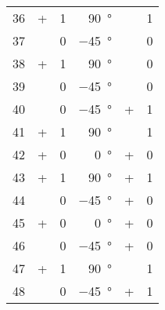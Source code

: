 \begin{longtable}[c]{rccrcc}
	36\hspace{1.5em} &      + & 1 & \qty{ 90}{\degree}\hspace{1.5em} & \times & 1 \\
	37\hspace{1.5em} & \times & 0 & \qty{-45}{\degree}\hspace{1.5em} & \times & 0 \\
	38\hspace{1.5em} &      + & 1 & \qty{ 90}{\degree}\hspace{1.5em} & \times & 0 \\
	39\hspace{1.5em} & \times & 0 & \qty{-45}{\degree}\hspace{1.5em} & \times & 0 \\
	40\hspace{1.5em} & \times & 0 & \qty{-45}{\degree}\hspace{1.5em} &      + & 1 \\
	41\hspace{1.5em} &      + & 1 & \qty{ 90}{\degree}\hspace{1.5em} & \times & 1 \\
	42\hspace{1.5em} &      + & 0 & \qty{  0}{\degree}\hspace{1.5em} &      + & 0 \\
	43\hspace{1.5em} &      + & 1 & \qty{ 90}{\degree}\hspace{1.5em} &      + & 1 \\
	44\hspace{1.5em} & \times & 0 & \qty{-45}{\degree}\hspace{1.5em} &      + & 0 \\
	45\hspace{1.5em} &      + & 0 & \qty{  0}{\degree}\hspace{1.5em} &      + & 0 \\
	46\hspace{1.5em} & \times & 0 & \qty{-45}{\degree}\hspace{1.5em} &      + & 0 \\
	47\hspace{1.5em} &      + & 1 & \qty{ 90}{\degree}\hspace{1.5em} & \times & 1 \\
	48\hspace{1.5em} & \times & 0 & \qty{-45}{\degree}\hspace{1.5em} &      + & 1 \\

\end{longtable}
